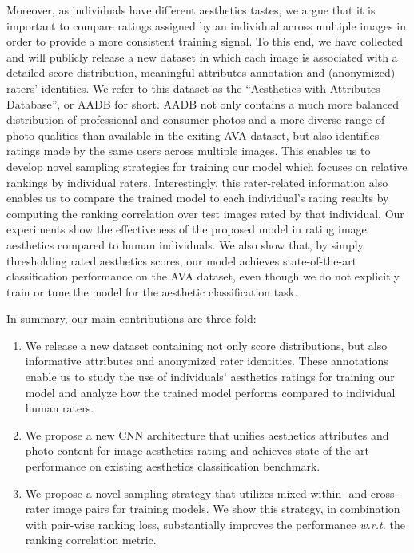 \documentclass[runningheads]{llncs}
\begin{document}
Moreover,
as individuals have different aesthetics tastes,
we argue that it is important to compare ratings assigned by an individual across multiple images in order to provide a more consistent training signal.
To this end,
we have collected and will publicly release a new dataset in which each image is associated with a detailed score distribution,
meaningful attributes annotation and (anonymized) raters' identities.
We refer to this dataset as the ``Aesthetics with Attributes Database'', or AADB for short.
AADB not only contains a much more balanced distribution of professional and consumer photos
and a more diverse range of photo qualities than available in the exiting AVA dataset,
but also identifies ratings made by the same users across multiple images.
This enables us to develop novel sampling strategies for training our model which focuses on relative rankings by individual raters.
Interestingly,
this rater-related information also enables us to compare the trained model to each individual's rating results
by computing the ranking correlation over test images rated by that individual.
Our experiments show the effectiveness of the proposed model in rating image aesthetics compared to human individuals.
We also show that, by simply thresholding rated aesthetics scores,
our model achieves state-of-the-art classification performance on the AVA dataset,
even though we do not explicitly train or tune the model for the aesthetic classification task.

In summary, our main contributions are three-fold:
\begin{enumerate}
  \item We release a new dataset containing not only score distributions, but also informative attributes and anonymized rater identities.
        These annotations enable us to study the use of individuals' aesthetics ratings for training our model
        and analyze how the trained model performs compared to individual human raters.
  \item We propose a new CNN architecture that unifies aesthetics attributes and photo content for image aesthetics rating
    and achieves state-of-the-art performance on existing aesthetics classification benchmark.
  \item We propose a novel sampling strategy that utilizes mixed within- and cross-rater image pairs for training models.
        We show this strategy, in combination with pair-wise ranking loss, substantially improves the performance \emph{w.r.t.} the ranking correlation metric.
\end{enumerate}
\end{document}
